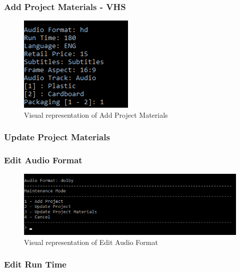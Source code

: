\documentclass[
  english,
  a4paper,
,tablecaptionabove
]{scrartcl}
\begin{document}
\newpage

\hypertarget{add-project-materials---vhs}{%
\subsubsection{Add Project Materials -
VHS}\label{add-project-materials---vhs}}

\begin{figure}
\centering
\includegraphics{images/ui-screenshots/add-project-materials-vhs.png}
\caption{Visual representation of Add Project Materials}
\end{figure}

\newpage

\hypertarget{update-project-materials}{%
\subsubsection{Update Project
Materials}\label{update-project-materials}}

\hypertarget{edit-audio-format}{%
\subsubsection{Edit Audio Format}\label{edit-audio-format}}

\begin{figure}
\centering
\includegraphics{images/ui-screenshots/update-project-material-audio-format.png}
\caption{Visual representation of Edit Audio Format}
\end{figure}

\newpage

\hypertarget{edit-run-time}{%
\subsubsection{Edit Run Time}\label{edit-run-time}}
\end{document}
